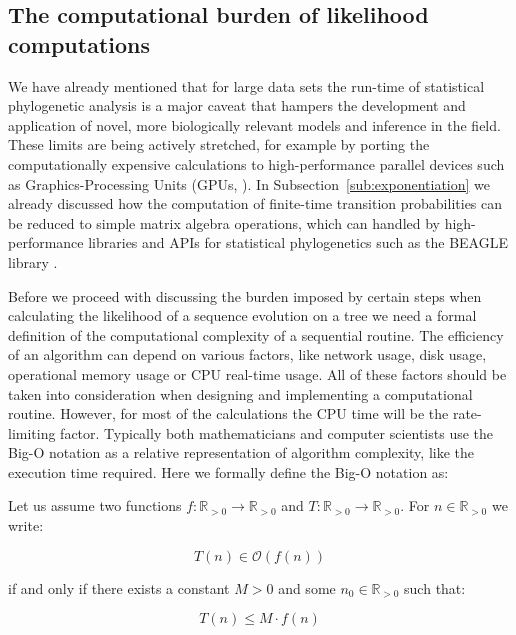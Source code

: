 
\subsection{The computational burden of likelihood computations\label{sub:mlburden}}

We have already mentioned that for large data sets the run-time of statistical phylogenetic analysis is a major caveat that hampers the development and application of novel, more biologically relevant models and inference in the field.
These limits are being actively stretched, for example by porting the computationally expensive calculations to high-performance parallel devices such as Graphics-Processing Units (GPUs, \cite{Nickolls2008}).
In Subsection~\ref{sub:exponentiation} we already discussed how the computation of finite-time transition probabilities can be reduced to simple matrix algebra operations, which can handled by high-performance libraries and APIs for statistical phylogenetics such as the BEAGLE library \citep{Ayres2012, Suchard2009}. 

Before we proceed with discussing the burden imposed by certain steps when calculating the likelihood of a sequence evolution on a tree we need a formal definition of the computational complexity of a sequential routine.
The efficiency of an algorithm can depend on various factors, like network usage, disk usage, operational memory usage or CPU real-time usage.
All of these factors should be taken into consideration when designing and implementing a computational routine. 
However, for most of the calculations the CPU time will be the rate-limiting factor.
Typically both mathematicians and computer scientists use the Big-O notation as a relative representation of algorithm complexity, like the execution time required.
Here we formally define the Big-O notation as:

\begin{definition}
Let us assume two functions $f:\mathbb{R}_{>0}\rightarrow\mathbb{R}_{>0}$ and $T:\mathbb{R}_{>0}\rightarrow\mathbb{R}_{>0}$. 
For $n \in \mathbb{R}_{>0}$ we write:

\begin{equation}
T(n) \in \mathcal{O}\left(f(n)\right)
\label{eq:bigOh}
\end{equation}

\noindent
if and only if there exists a constant $M>0$ and some $n_0 \in \mathbb{R}_{>0}$ such that:

\begin{equation}
T(n)\leq M \cdot f(n)
\end{equation}
\end{definition}


